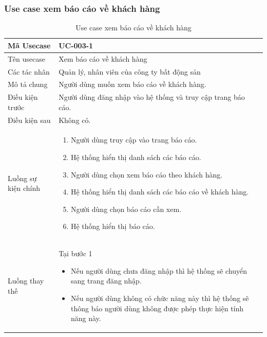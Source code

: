 \documentclass[12pt,a4paper]{article}
\begin{document}
    \subsubsection*{Use case xem báo cáo về khách hàng}
    \begin{table}[H]
        \centering
        \begin{tabular}{|p{3.5cm}|p{11.5cm}|c|}
            \hline
            Mã Usecase      & UC-003-1                                                     \\
            \hline
            Tên usecase     & Xem báo cáo về khách hàng                                    \\
            \hline
            Các tác nhân    & Quản lý, nhân viên của công ty bất động sản                  \\
            \hline
            Mô tả chung     & Người dùng muốn xem báo cáo về khách hàng.                   \\
            \hline
            Điều kiện trước & Người dùng đăng nhập vào hệ thống và truy cập trang báo cáo. \\
            \hline
            Điều kiện sau   & Không có.                                                    \\
            \hline
            Luồng sự kiện chính & \vspace{-.8cm}\begin{enumerate}
                                                    \item Người dùng truy cập vào trang báo cáo.
                                                    \item Hệ thống hiển thị danh sách các báo cáo.
                                                    \item Người dùng chọn xem báo cáo theo khách hàng.
                                                    \item Hệ thống hiển thị danh sách các báo cáo về khách hàng.
                                                    \item Người dùng chọn báo cáo cần xem.
                                                    \item Hệ thống hiển thị báo cáo.
            \end{enumerate}
            \\
            \hline
            Luồng thay thế & Tại bước 1\newline
            \vspace{-.8cm}\begin{itemize}
                              \item Nếu người dùng chưa đăng nhập thì hệ thống sẽ chuyển sang trang đăng nhập.
                              \item Nếu người dùng không có chức năng này thì hệ thống sẽ thông báo người dùng không được phép thực hiện tính năng này.
            \end{itemize}
            \\ \hline
        \end{tabular}
        \caption{Use case xem báo cáo về khách hàng}
    \end{table}
\end{document}

